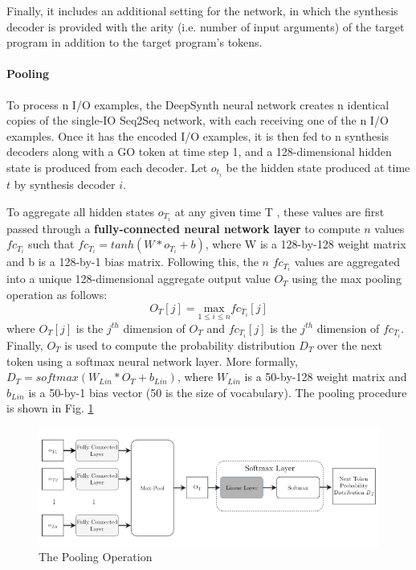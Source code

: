 Finally, it includes an additional setting for the network, in which the synthesis decoder is provided with the arity (i.e. number of input arguments) of the target program in addition to the target program’s tokens.

\paragraph{Pooling}
To process n I/O examples, the DeepSynth neural network creates n identical copies of the single-IO Seq2Seq network, with each receiving one of the n I/O examples. Once it has the encoded I/O examples, it is then fed to n synthesis decoders along with a GO token at time step 1, and a 128-dimensional hidden state is produced from each decoder. Let $o_{t_i}$ be the hidden state produced at time $t$ by synthesis decoder $i$. 

To aggregate all hidden states $o_{T_i}$ at any given time T , these values are first passed through a \textbf{fully-connected neural network layer} to compute
$n$ values ${fc}_{T_i}$ such that ${fc}_{T_i} = tanh(W * o_{T_i} + b)$, where W is a 128-by-128 weight matrix and b is a 128-by-1 bias matrix. Following this, the $n$ ${fc}_{T_i}$ values are aggregated into a unique 128-dimensional aggregate output value $O_T$ using the max pooling operation as follows: $$O_T[j] = \underset{1\le i \le n}{\mathrm{max}}{fc}_{T_i}[j]$$
where $O_T[j]$ is the $j^{th}$ dimension of $O_T$ and ${fc}_{T_i}[j]$ is the $j^{th}$ dimension of ${fc}_{T_i}$. Finally, $O_T$ is used to compute the probability distribution $D_T$ over the next token using a softmax neural network layer. More formally, $D_T = softmax(W_{Lin} * O_T + b_{Lin})$, where $W_{Lin}$ is a 50-by-128 weight matrix and $b_{Lin}$ is a 50-by-1 bias vector (50 is the size of vocabulary). The pooling procedure is shown in Fig. \ref{fig:pool}
\begin{figure}
    \centering
    \includegraphics[scale=0.5]{pool.png}
    \caption{The Pooling Operation}
    \label{fig:pool}
\end{figure}

